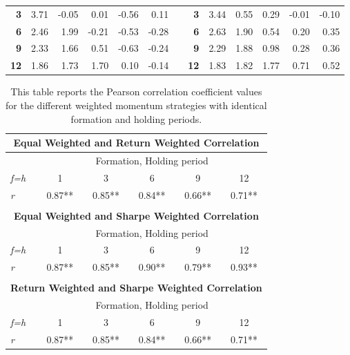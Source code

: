 \documentclass{article}
\begin{document}
\begin{table}[htbp]
\begin{tabular}{rrrrrrrrrrrrr}
    \textbf{3} & 3.71  & -0.05 & 0.01  & -0.56 & 0.11  &       & \textbf{3} & 3.44  & 0.55  & 0.29  & -0.01 & -0.10 \\
    \textbf{6} & 2.46  & 1.99  & -0.21 & -0.53 & -0.28 &       & \textbf{6} & 2.63  & 1.90  & 0.54  & 0.20  & 0.35 \\
    \textbf{9} & 2.33  & 1.66  & 0.51  & -0.63 & -0.24 &       & \textbf{9} & 2.29  & 1.88  & 0.98  & 0.28  & 0.36 \\
    \textbf{12} & 1.86  & 1.73  & 1.70  & 0.10  & -0.14 &       & \textbf{12} & 1.83  & 1.82  & 1.77  & 0.71  & 0.52 \\
    \bottomrule
    \end{tabular}%
  \label{VOLSPLIT}%
\end{table}%

\begin{table}[htbp]
  \centering
  \caption{This table reports the Pearson correlation coefficient values for the different weighted momentum strategies with identical formation and holding periods.}
    \begin{tabular}{lccccc}
    \multicolumn{6}{c}{\textbf{Equal Weighted and Return Weighted Correlation}} \\
    \midrule
          & \multicolumn{5}{c}{Formation, Holding period} \\
    \textit{f=h} & 1     & 3     & 6     & 9     & 12 \\
    \textit{r} & 0.87** & 0.85** & 0.84** & 0.66** & 0.71** \\
    \midrule
          &       &       &       &       &  \\
    \multicolumn{6}{c}{\textbf{Equal Weighted and Sharpe Weighted Correlation}} \\
    \midrule
          & \multicolumn{5}{c}{Formation, Holding period} \\
    \textit{f=h} & 1     & 3     & 6     & 9     & 12 \\
    \textit{r} & 0.87** & 0.85** & 0.90** & 0.79** & 0.93** \\
    \midrule
          &       &       &       &       &  \\
    \multicolumn{6}{c}{\textbf{Return Weighted and Sharpe Weighted Correlation}} \\
    \midrule
          & \multicolumn{5}{c}{Formation, Holding period} \\
    \textit{f=h} & 1     & 3     & 6     & 9     & 12 \\
    \textit{r} & 0.87** & 0.85** & 0.84** & 0.66** & 0.71** \\
    \bottomrule
    \end{tabular}%
  \label{tab:addlabel}%
\end{table}%
\end{document}
